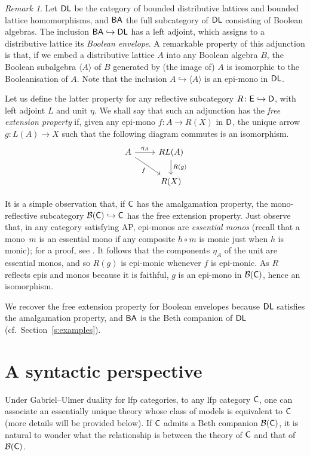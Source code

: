 \documentclass[a4paper,10pt,reqno]{amsart}
\theoremstyle{definition}
\theoremstyle{remark}
\newtheorem{remark}[theorem]{Remark}
\newcommand{\cat}{{\sf C}}								%
\newcommand{\catt}{{\sf D}}								%
\newcommand{\B}[1]{\mathcal{B}(#1)}						%
\newcommand{\DL}{{\sf DL}}								%
\newcommand{\BA}{{\sf BA}}								%
\newcommand{\into}{\hookrightarrow}						%
\newcommand{\AP}{\textnormal{AP}}
\begin{document}
\begin{remark}
Let $\DL$ be the category of bounded distributive lattices and bounded lattice homomorphisms, and $\BA$ the full subcategory of $\DL$ consisting of Boolean algebras. The inclusion $\BA\into \DL$ has a left adjoint, which assigns to a distributive lattice its \emph{Boolean envelope}. A remarkable property of this adjunction is that, if we embed a distributive lattice $A$ into any Boolean algebra $B$, the Boolean subalgebra $\langle A\rangle$ of $B$ generated by (the image of) $A$ is isomorphic to the Booleanisation of $A$. Note that the inclusion $A\into \langle A\rangle$ is an epi-mono in $\DL$. 

Let us define the latter property for any reflective subcategory $R\colon \sf{E}\into \catt$, with left adjoint $L$ and unit $\eta$. We shall say that such an adjunction has the \emph{free extension property} if, given any epi-mono $f\colon A\to R(X)$ in $\catt$, the unique arrow $g\colon L(A)\to X$ such that the following diagram commutes is an isomorphism.
\[\begin{tikzcd}
A \arrow{r}{\eta_{A}} \arrow{dr}[swap]{f} & RL(A) \arrow{d}{R(g)} \\
{} & R(X)
\end{tikzcd}\]

It is a simple observation that, if $\cat$ has the amalgamation property, the mono-reflective subcategory $\B{\cat}\into\cat$ has the free extension property. Just observe that, in any category satisfying \AP, epi-monos are \emph{essential monos} (recall that a mono~$m$ is an essential mono if any composite $h\circ m$ is monic just when $h$ is monic); for a proof, see \cite[\S 2]{Ringel1971}. It follows that the components $\eta_{A}$ of the unit are essential monos, and so $R(g)$ is epi-monic whenever $f$ is epi-monic. As $R$ reflects epis and monos because it is faithful, $g$ is an epi-mono in $\B{\cat}$, hence an isomorphism.

We recover the free extension property for Boolean envelopes because $\DL$ satisfies the amalgamation property, and $\BA$ is the Beth companion of $\DL$ (cf.\ Section~\ref{s:examples}).
\end{remark}



\section{A syntactic perspective}\label{s:syntactic-viewpoint}

Under Gabriel--Ulmer duality for lfp categories, to any lfp category $\cat$, one can associate an essentially unique theory whose class of models is equivalent to $\cat$ (more details will be provided below). If $\cat$ admits a Beth companion $\B{\cat}$, it is natural to wonder what the relationship is between the theory of $\cat$ and that of $\B{\cat}$.
\end{document}
